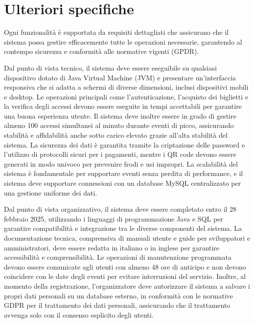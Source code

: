 \documentclass[a4paper]{article}
\begin{document}
\section{Ulteriori specifiche}
\textcolor{textcolor}{
Ogni funzionalità è supportata da requisiti dettagliati che assicurano che il sistema possa gestire efficacemente tutte le operazioni necessarie, garantendo al contempo sicurezza e conformità alle normative vigenti (GPDR).

Dal punto di vista tecnico, il sistema deve essere eseguibile su qualsiasi dispositivo dotato di Java Virtual Machine (JVM) e presentare un’interfaccia responsiva che si adatta a schermi di diverse dimensioni, inclusi dispositivi mobili e desktop. Le operazioni principali come l'autenticazione, l'acquisto dei biglietti e la verifica degli accessi devono essere eseguite in tempi accettabili per garantire una buona esperienza utente. Il sistema deve inoltre essere in grado di gestire almeno 100 accessi simultanei al minuto durante eventi di picco, assicurando stabilità e affidabilità anche sotto carico elevato grazie all’alta stabilità del sistema. La sicurezza dei dati è garantita tramite la criptazione delle password e l'utilizzo di protocolli sicuri per i pagamenti, mentre i QR code devono essere generati in modo univoco per prevenire frodi e usi impropri. La scalabilità del sistema è fondamentale per supportare eventi senza perdita di performance, e il sistema deve supportare connessioni con un database MySQL centralizzato per una gestione uniforme dei dati.

Dal punto di vista organizzativo, il sistema deve essere completato entro il 28 febbraio 2025, utilizzando i linguaggi di programmazione Java e SQL per garantire compatibilità e integrazione tra le diverse componenti del sistema. La documentazione tecnica, comprensiva di manuali utente e guide per sviluppatori e amministratori, deve essere redatta in italiano o in inglese per garantire accessibilità e comprensibilità. Le operazioni di manutenzione programmata devono essere comunicate agli utenti con almeno 48 ore di anticipo e non devono coincidere con le date degli eventi per evitare interruzioni del servizio. Inoltre, al momento della registrazione, l’organizzatore deve autorizzare il sistema a salvare i propri dati personali su un database esterno, in conformità con le normative GDPR per il trattamento dei dati personali, assicurando che il trattamento avvenga solo con il consenso esplicito degli utenti.
}
\end{document}
